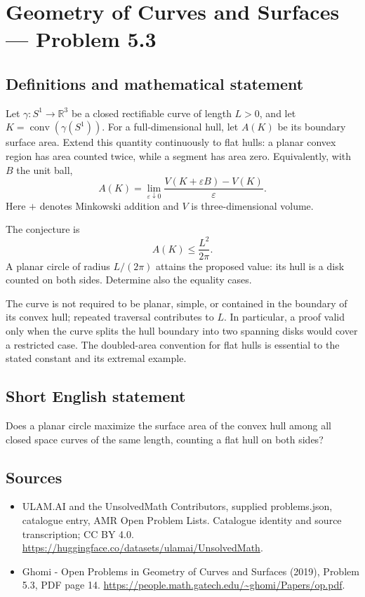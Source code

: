 \documentclass[11pt,a4paper]{article}
\begin{document}
\section*{Geometry of Curves and Surfaces — Problem 5.3}\label{statement}

\subsection{Definitions and mathematical statement}
Let $\gamma:S^1\to\mathbb R^3$ be a closed rectifiable curve of
length $L>0$, and let $K=\operatorname{conv}(\gamma(S^1))$.
For a full-dimensional hull, let $A(K)$ be its boundary surface
area. Extend this quantity continuously to flat hulls: a planar
convex region has area counted twice, while a segment has area
zero. Equivalently, with $B$ the unit ball,
\[
 A(K)=\lim_{\varepsilon\downarrow0}
       \frac{V(K+\varepsilon B)-V(K)}{\varepsilon}.
\]
Here $+$ denotes Minkowski addition and $V$ is three-dimensional
volume.

The conjecture is
\[
                              A(K)\le\frac{L^2}{2\pi}.
\]
A planar circle of radius $L/(2\pi)$ attains the proposed value:
its hull is a disk counted on both sides. Determine also the
equality cases.

The curve is not required to be planar, simple, or contained in
the boundary of its convex hull; repeated traversal contributes
to $L$. In particular, a proof valid only when the curve splits
the hull boundary into two spanning disks would cover a
restricted case. The doubled-area convention for flat hulls is
essential to the stated constant and its extremal example.
\subsection{Short English statement}
Does a planar circle maximize the surface area of the convex hull
among all closed space curves of the same length, counting a
flat hull on both sides?
\subsection{Sources}
\begin{itemize}
\item[S1] ULAM.AI and the UnsolvedMath Contributors, supplied problems.json, catalogue entry, AMR Open Problem Lists. Catalogue identity and source transcription; CC BY 4.0.
\url{https://huggingface.co/datasets/ulamai/UnsolvedMath}.
\item[S2] Ghomi - Open Problems in Geometry of Curves and Surfaces (2019), Problem 5.3, PDF page 14. 
\url{https://people.math.gatech.edu/~ghomi/Papers/op.pdf}.
\end{itemize}
\end{document}
